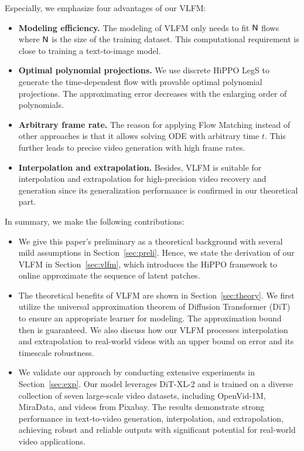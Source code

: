 Especially, we emphasize four advantages of our VLFM:
\begin{itemize}
    \item {\bf Modeling efficiency. } The modeling of VLFM only needs to fit ${\sf N}$ flows where ${\sf N}$ is the size of the training dataset. This computational requirement is close to training a text-to-image model.
    \item {\bf Optimal polynomial projections. } We use discrete HiPPO LegS to generate the time-dependent flow with provable optimal polynomial projections. The approximating error decreases with the enlarging order of polynomials.
    \item {\bf Arbitrary frame rate. } The reason for applying Flow Matching instead of other approaches is that it allows solving ODE with arbitrary time $t$. This further leads to precise video generation with high frame rates.
    \item {\bf Interpolation and extrapolation. } Besides, VLFM is suitable for interpolation and extrapolation for high-precision video recovery and generation since its generalization performance is confirmed in our theoretical part.
\end{itemize}
\ifdefined\isarxiv
\else
\vspace{-3mm}
\fi

In summary, we make the following contributions:
\begin{itemize}
    \item We give this paper's preliminary as a theoretical background with several mild assumptions in Section~\ref{sec:preli}. Hence, we state the derivation of our VLFM in Section~\ref{sec:vlfm}, which introduces the HiPPO framework to online approximate the sequence of latent patches.
    \item The theoretical benefits of VLFM are shown in Section~\ref{sec:theory}. We first utilize the universal approximation theorem of Diffusion Transformer (DiT) to ensure an appropriate learner for modeling. The approximation bound then is guaranteed. We also discuss how our VLFM processes interpolation and extrapolation to real-world videos with an upper bound on error and its timescale robustness.
    \item We validate our approach by conducting extensive experiments in Section~\ref{sec:exp}. Our model leverages DiT-XL-2 and is trained on a diverse collection of seven large-scale video datasets, including OpenVid-1M, MiraData, and videos from Pixabay. The results demonstrate strong performance in text-to-video generation, interpolation, and extrapolation, achieving robust and reliable outputs with significant potential for real-world video applications.
\end{itemize}

